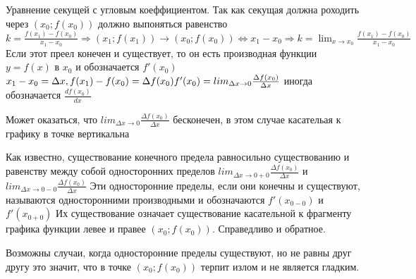 \documentclass[oneside]{book}
\begin{document}
\par Уравнение секущей с угловым коеффициентом. Так как секущая должна роходить через $(x_0; f(x_0))$ должно выпоняться равенство $k = \frac{f(x_1) - f(x_0)}{x_1 - x_0} \Rightarrow (x_1; f(x_1)) \rightarrow (x_0; f(x_0)) \Leftrightarrow x_1 - x_0 \Rightarrow
k = \lim_{x \rightarrow x_0}{\frac{f(x_1) - f(x_0)}{x_1 - x_0}}$ Если этот преел конечен и существует, то он есть производная функции
$y = f(x)$ в $x_0$ и обозначается $f'(x_0)$ \\
$x_1 - x_0 = \Delta x, f(x_1) - f(x_0) = \Delta f(x_0) \\ f'(x_0) = lim_{\Delta x \rightarrow 0}{\frac{\Delta f(x_0)}{\Delta x}}$ иногда обозначается $\frac{df(x_0)}{dx}$ \par Может оказаться, что $lim_{\Delta x \rightarrow 0}{\frac{\Delta f(x_0)}{\Delta x}}$ бесконечен,
в этом случае касательая к графику в точке вертикальна
\par Как известно, существование конечного предела равносильно существованию и равенству между собой односторонних пределов $lim_{\Delta x \rightarrow 0+0}{\frac{\Delta f(x_0)}{\Delta x}}$ и $lim_{\Delta x \rightarrow 0-0}{\frac{\Delta f(x_0)}{\Delta x}}$
Эти односторонние пределы, если они конечны и существуют, называются односторонними производными и обозначаются $f'(x_{0-0})$ и $f'(x_{0+0})$
Их существование означает существование касательной к фрагменту графика функции левее и правее $(x_0; f(x_0))$. Справедливо и обратное.
\par Возможны случаи, когда односторонние пределы существуют, но не равны друг другу это значит, что в точке $(x_0; f(x_0))$ терпит излом и не является гладким.
\end{document}
